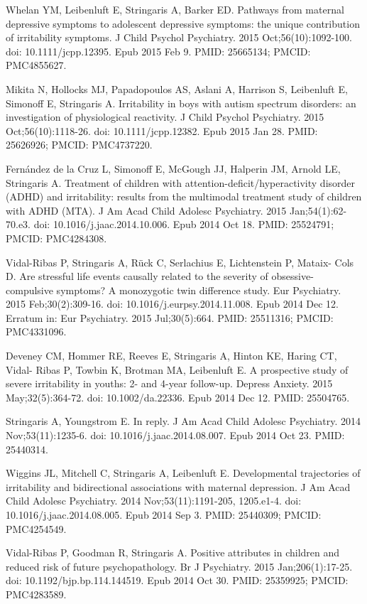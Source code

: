 \documentclass[
]{article}
\begin{document}
Whelan YM, Leibenluft E, Stringaris A, Barker ED. Pathways from maternal
depressive symptoms to adolescent depressive symptoms: the unique
contribution of irritability symptoms. J Child Psychol Psychiatry. 2015
Oct;56(10):1092-100. doi: 10.1111/jcpp.12395. Epub 2015 Feb 9. PMID:
25665134; PMCID: PMC4855627.

Mikita N, Hollocks MJ, Papadopoulos AS, Aslani A, Harrison S, Leibenluft
E, Simonoff E, Stringaris A. Irritability in boys with autism spectrum
disorders: an investigation of physiological reactivity. J Child Psychol
Psychiatry. 2015 Oct;56(10):1118-26. doi: 10.1111/jcpp.12382. Epub 2015
Jan 28. PMID: 25626926; PMCID: PMC4737220.

Fernández de la Cruz L, Simonoff E, McGough JJ, Halperin JM, Arnold LE,
Stringaris A. Treatment of children with attention-deficit/hyperactivity
disorder (ADHD) and irritability: results from the multimodal treatment
study of children with ADHD (MTA). J Am Acad Child Adolesc Psychiatry.
2015 Jan;54(1):62-70.e3. doi: 10.1016/j.jaac.2014.10.006. Epub 2014 Oct
18. PMID: 25524791; PMCID: PMC4284308.

Vidal-Ribas P, Stringaris A, Rück C, Serlachius E, Lichtenstein P,
Mataix- Cols D. Are stressful life events causally related to the
severity of obsessive- compulsive symptoms? A monozygotic twin
difference study. Eur Psychiatry. 2015 Feb;30(2):309-16. doi:
10.1016/j.eurpsy.2014.11.008. Epub 2014 Dec 12. Erratum in: Eur
Psychiatry. 2015 Jul;30(5):664. PMID: 25511316; PMCID: PMC4331096.

Deveney CM, Hommer RE, Reeves E, Stringaris A, Hinton KE, Haring CT,
Vidal- Ribas P, Towbin K, Brotman MA, Leibenluft E. A prospective study
of severe irritability in youths: 2- and 4-year follow-up. Depress
Anxiety. 2015 May;32(5):364-72. doi: 10.1002/da.22336. Epub 2014 Dec 12.
PMID: 25504765.

Stringaris A, Youngstrom E. In reply. J Am Acad Child Adolesc
Psychiatry. 2014 Nov;53(11):1235-6. doi: 10.1016/j.jaac.2014.08.007.
Epub 2014 Oct 23. PMID: 25440314.

Wiggins JL, Mitchell C, Stringaris A, Leibenluft E. Developmental
trajectories of irritability and bidirectional associations with
maternal depression. J Am Acad Child Adolesc Psychiatry. 2014
Nov;53(11):1191-205, 1205.e1-4. doi: 10.1016/j.jaac.2014.08.005. Epub
2014 Sep 3. PMID: 25440309; PMCID: PMC4254549.

Vidal-Ribas P, Goodman R, Stringaris A. Positive attributes in children
and reduced risk of future psychopathology. Br J Psychiatry. 2015
Jan;206(1):17-25. doi: 10.1192/bjp.bp.114.144519. Epub 2014 Oct 30.
PMID: 25359925; PMCID: PMC4283589.
\end{document}
